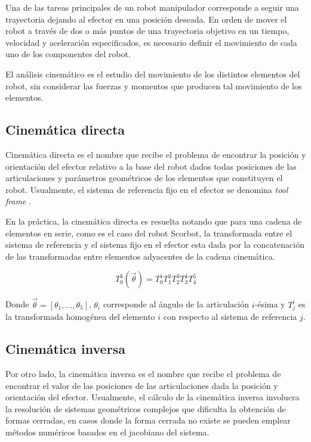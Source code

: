 Una de las tareas principales de un robot manipulador corresponde a seguir una trayectoria dejando al efector en una posición deseada. En orden de mover el robot a través de dos o más puntos de una trayectoria objetivo en un tiempo, velocidad y aceleración especificados, es necesario definir el movimiento de cada uno de los componentes del robot.

El análisis cinemático es el estudio del movimiento de los distintos elementos del robot, sin considerar las fuerzas y momentos que producen tal movimiento de los elementos.

\subsection{Cinemática directa}

Cinemática directa es el nombre que recibe el problema de encontrar la posición y orientación del efector relativo a la base del robot dados todas posiciones de las articulaciones y parámetros geométricos de los elementos que constituyen el robot. Usualmente, el sistema de referencia fijo en el efector se denomina \textit{tool frame} \cite{handbook}.

En la práctica, la cinemática directa es resuelta notando que para una cadena de elementos en serie, como es el caso del robot Scorbot, la transformada entre el sistema de referencia y el sistema fijo en el efector esta dada por la concatenación de las transformadas entre elementos adyacentes de la cadena cinemática.

\begin{equation}
T_0^5(\vec{\theta}) = T_0^1 T_1^2 T_2^3 T_3^4 T_4^5 
\end{equation}

Donde $\vec{\theta}=[\theta_1,\dotsc,\theta_5]$, $\theta_i$ corresponde al ángulo de la articulación $i$-ésima y $T_j^i$ es la transformada homogénea del elemento $i$ con respecto al sistema de referencia $j$.

\subsection{Cinemática inversa}

Por otro lado, la cinemática inversa es el nombre que recibe el problema de encontrar el valor de las posiciones de las articulaciones dada la posición y orientación del efector.
Usualmente, el cálculo de la cinemática inversa involucra la resolución de sistemas geométricos complejos que dificulta la obtención de formas cerradas, en casos donde la forma cerrada no existe se pueden emplear métodos numéricos basados en el jacobiano del sistema.

